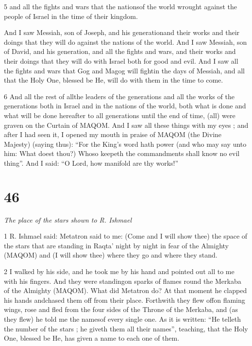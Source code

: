 \par 5 and all the fights and wars that the nationsof the world wrought against the people of Israel in the time of their kingdom. 

\par And I saw Messiah, son of Joseph, and his generationand their works and their doings that they will do against the nations of the world. And I saw Messiah, son of David, and his generation, and all the fights and wars, and their works and their doings that they will do with Israel both for good and evil. And I saw all the fights and wars that Gog and Magog will fightin the days of Messiah, and all that the Holy One, blessed be He, will do with them in the time to come. 

\par 6 And all the rest of allthe leaders of the generations and all the works of the generations both in Israel and in the nations of the world, both what is done and what will be done hereafter to all generations until the end of time, (all) were graven on the Curtain of MAQOM. And I saw all these things with my eyes ; and after I had seen it, I opened my mouth in praise of MAQOM (the Divine Majesty) (saying thus): “For the King's word hath power (and who may say unto him: What doest thou?) Whoso keepeth the commandments shall know no evil thing”. And I said: “O Lord, how manifold are thy works!” 



\chapter{46}

\par \textit{The place of the stars shown to R. Ishmael}

\par 1 R. Ishmael said: Metatron said to me: (Come and I will show thee) the space of the stars that are standing in Raqta' night by night in fear of the Almighty (MAQOM) and (I will show thee) where they go and where they stand. 

\par 2 I walked by his side, and he took me by his hand and pointed out all to me with his fingers. And they were standingon sparks of flames round the Merkaba of the Almighty (MAQOM). What did Metatron do? At that moment he clapped his hands andchased them off from their place. Forthwith they flew offon flaming wings, rose and fled from the four sides of the Throne of the Merkaba, and (as they flew) he told me the namesof every single one. As it is written: “He telleth the number of the stars ; he giveth them all their names”, teaching, that the Holy One, blessed be He, has given a name to each one of them. 

